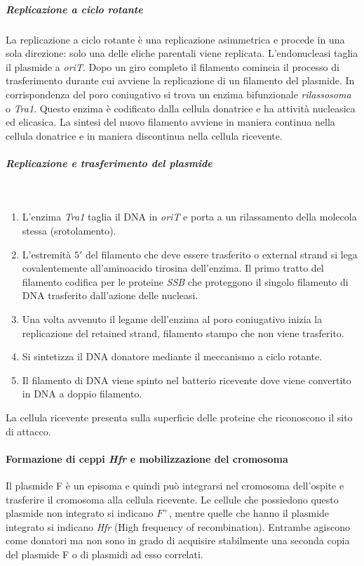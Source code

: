 				\subparagraph{Replicazione a ciclo rotante}
				La replicazione a ciclo rotante \`e una replicazione asimmetrica e procede in una sola direzione: solo una delle eliche parentali viene replicata.
				L'endonucleasi taglia il plasmide a \emph{oriT}.
				Dopo un giro completo il filamento comincia il processo di trasferimento durante cui avviene la replicazione di un filamento del plasmide.
				In corrispondenza del poro coniugativo si trova un enzima bifunzionale \emph{rilassosoma} o \emph{Tra1}.
				Questo enzima \`e codificato dalla cellula donatrice e ha attivit\`a nucleasica ed elicasica.
				La sintesi del nuovo filamento avviene in maniera continua nella cellula donatrice e in maniera discontinua nella cellula ricevente.

				\subparagraph{Replicazione e trasferimento del plasmide}\mbox{}\\
				\begin{multicols}{2}
					\begin{enumerate}
    						\item L'enzima \emph{Tra1} taglia il DNA in \emph{oriT} e porta a un rilassamento della molecola stessa (srotolamento). 
						\item L'estremità $5'$ del filamento che deve essere trasferito o external strand si lega covalentemente all'aminoacido tirosina dell'enzima. 
							Il primo tratto del filamento codifica per le proteine \emph{SSB} che proteggono il singolo filamento di DNA trasferito dall'azione delle nucleasi. 
    						\item Una volta avvenuto il legame dell'enzima al poro coniugativo inizia la replicazione del retained strand, filamento stampo che non viene trasferito.
						\item Si sintetizza il DNA donatore mediante il meccanismo a ciclo rotante.
						\item Il filamento di DNA viene spinto nel batterio ricevente dove viene convertito in DNA a doppio filamento.
					\end{enumerate}
				\end{multicols}
				La cellula ricevente presenta sulla superficie delle proteine che riconoscono il sito di attacco. 

			\paragraph{Formazione di ceppi \emph{Hfr} e mobilizzazione del cromosoma}
			Il plasmide F è un episoma e quindi può integrarsi nel cromosoma dell'ospite e trasferire il cromosoma alla cellula ricevente. 
			Le cellule che possiedono questo plasmide non integrato si indicano \emph{$F^{+}$}, mentre quelle che hanno il plasmide integrato si indicano \emph{Hfr} (High frequency of recombination). 
			Entrambe agiscono come donatori ma non sono in grado di acquisire stabilmente una seconda copia del plasmide F o di plasmidi ad esso correlati.

